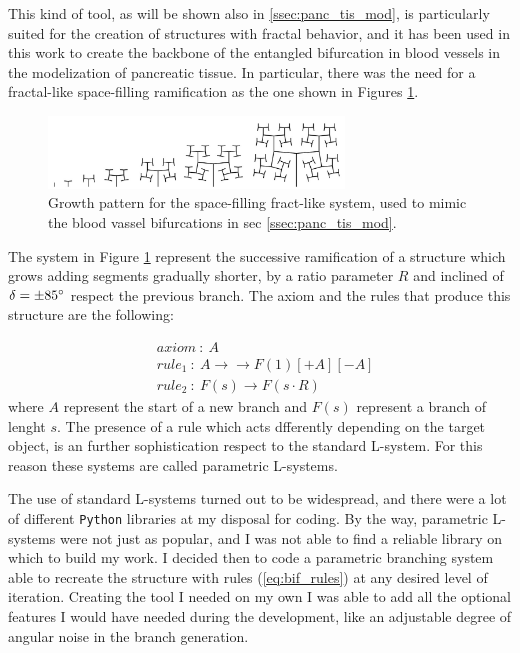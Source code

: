 This kind of tool, as will be shown also in \ref{ssec:panc_tis_mod}, is particularly suited for the creation of structures with fractal behavior, and it has been used in this work to create the backbone of the entangled bifurcation in blood vessels in the modelization of pancreatic tissue. In particular, there was the need for a fractal-like space-filling ramification as the one shown in Figures \ref{fig:bf_ls}. %

\begin{figure}
    \centering
    \includegraphics[width = 0.7\textwidth]{images/bf_ls}
    \caption{Growth pattern for the space-filling fract-like system, used to mimic the blood vassel bifurcations in sec \ref{ssec:panc_tis_mod}.}
    \label{fig:bf_ls}
\end{figure}


The system in Figure \ref{fig:bf_ls} represent the successive ramification of a structure which grows adding segments gradually shorter, by a ratio parameter $R$ and inclined of $\delta = \pm 85 \degree$ respect the previous branch. The axiom and the rules that produce this structure are the following:

\begin{align}
    & axiom\ :\ A \label{eq:bif_rules} \\
    & rule_1\ :\ A \rightarrow → F(1)[+A][-A] \nonumber \\
    & rule_2\ :\ F(s) \rightarrow F(s\cdot R) \nonumber
\end{align}
where $A$ represent the start of a new branch  and $F(s)$ represent a branch of lenght $s$. The presence of a rule which acts dfferently depending on the target object, is an further sophistication respect to the standard L-system. For this reason these systems are called parametric L-systems.

The use of standard L-systems turned out to be widespread, and there were a lot of different \texttt{Python} libraries at my disposal for coding. By the way, parametric L-systems were not just as popular, and I was not able to find a reliable library on which to build my work. I decided then to code a parametric branching system able to recreate the structure with rules (\ref{eq:bif_rules}) at any desired level of iteration. Creating the tool I needed on my own I was able to add all the optional features I would have needed during the development, like an adjustable degree of angular noise in the branch generation.


